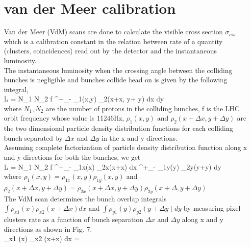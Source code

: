 \newpage \section{van der Meer calibration}
\label{sec:vdm}
Van der Meer (VdM) scans are done to calculate the visible cross section $\sigma_{vis}$ which is a calibration constant in the relation between rate of a quantity (clusters, coincidences) read out by the detector and the instantaneous luminosity. \\

The instantaneous luminosity when the crossing angle between the colliding bunches is negligible and bunches collide head on is given by the following integral, \\

L = N_1 N_2 f \int^{+\infty}_{-\infty} \rho_1(x,y) \rho_2(x+\Delta x, y+ \Delta y) dx dy \\

where $N_1, N_2$ are the number of protons in the colliding bunches, f is the LHC orbit frequency whose value is 11246Hz,  $\rho_1(x,y)$ and $\rho_2(x+\Delta x,y+\Delta y)$ are the two dimensional particle density distribution functions for each colliding bunch separated by $\Delta x$ and $\Delta y$ in the x and y directions. \\

Assuming complete factorization of particle density distribution function along x and y directions for both the bunches, we get \\

L = N_1 N_2 f \int^{+\infty}_{-\infty} \rho_{1x}(x) \rho_{2x}(x+\Delta x)  dx   \int^{+\infty}_{-\infty} \rho_{1y}(y) \rho_{2y}(y+\Delta y)  dy \\

where $\rho_1(x,y) = \rho_{1x}(x,y) \rho_{1y} (x,y)$ and $\rho_2(x+\Delta x,y + \Delta y) = \rho_{2x}(x+\Delta x,y+\Delta y) \rho_{2y} (x+\Delta,y+\Delta y)$ \\

The VdM scan determines the bunch  overlap integrals $\int \rho_{x1} (x) \rho_{x2} (x+\Delta x) dx$ and  $\int \rho_{y1}(y) \rho_{y2} (y+\Delta y) dy$ by measuring pixel clusters rate as a function of bunch separation $\Delta x$ and $\Delta y$ along x and y directions as shown in Fig. 7. \\

\int \rho_{x1} (x) \rho_{x2} (x+\Delta x) dx =  \\

